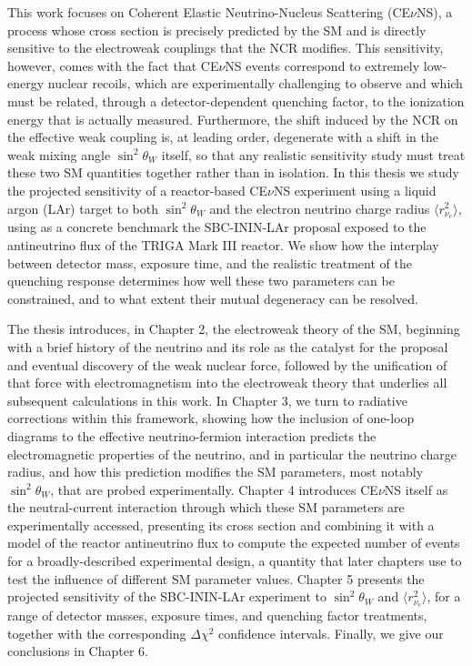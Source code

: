 This work focuses on Coherent Elastic Neutrino-Nucleus Scattering (CE$\nu$NS), a process whose cross section is precisely predicted by the SM and is directly sensitive to the electroweak couplings that the NCR modifies. This sensitivity, however, comes with the fact that CE$\nu$NS events correspond to extremely low-energy nuclear recoils, which are experimentally challenging to observe and which must be related, through a detector-dependent quenching factor, to the ionization energy that is actually measured. Furthermore, the shift induced by the NCR on the effective weak coupling is, at leading order, degenerate with a shift in the weak mixing angle $\sin^2\theta_W$ itself, so that any realistic sensitivity study must treat these two SM quantities together rather than in isolation. In this thesis we study the projected sensitivity of a reactor-based CE$\nu$NS experiment using a liquid argon (LAr) target to both $\sin^2\theta_W$ and the electron neutrino charge radius $\langle r_{\nu_e}^2\rangle$, using as a concrete benchmark the SBC-ININ-LAr proposal exposed to the antineutrino flux of the TRIGA Mark III reactor. We show how the interplay between detector mass, exposure time, and the realistic treatment of the quenching response determines how well these two parameters can be constrained, and to what extent their mutual degeneracy can be resolved.

The thesis introduces, in Chapter 2, the electroweak theory of the SM, beginning with a brief history of the neutrino and its role as the catalyst for the proposal and eventual discovery of the weak nuclear force, followed by the unification of that force with electromagnetism into the electroweak theory that underlies all subsequent calculations in this work. In Chapter 3, we turn to radiative corrections within this framework, showing how the inclusion of one-loop diagrams to the effective neutrino-fermion interaction predicts the electromagnetic properties of the neutrino, and in particular the neutrino charge radius, and how this prediction modifies the SM parameters, most notably $\sin^2\theta_W$, that are probed experimentally. Chapter 4 introduces CE$\nu$NS itself as the neutral-current interaction through which these SM parameters are experimentally accessed, presenting its cross section and combining it with a model of the reactor antineutrino flux to compute the expected number of events for a broadly-described experimental design, a quantity that later chapters use to test the influence of different SM parameter values. Chapter 5 presents the projected sensitivity of the SBC-ININ-LAr experiment to $\sin^2\theta_W$ and $\langle r_{\nu_e}^2\rangle$, for a range of detector masses, exposure times, and quenching factor treatments, together with the corresponding $\Delta\chi^2$ confidence intervals. Finally, we give our conclusions in Chapter 6.